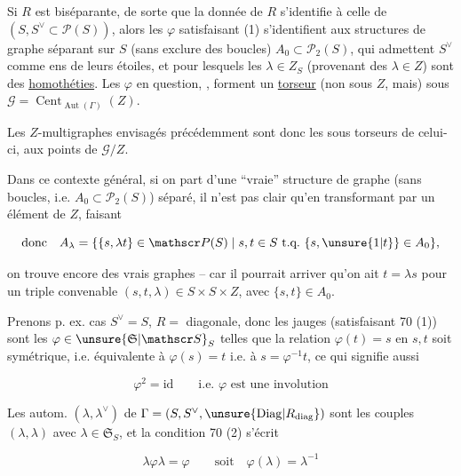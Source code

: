 Si $R$ est biséparante, de sorte que  la donnée de $R$ s'identifie à celle de $(S,S^\vee\subset\mathscr P(S))$, alors les $\varphi$ satisfaisant (1) s'identifient aux structures de graphe   séparant sur $S$ (sans exclure des boucles) $A_0\subset\mathscr P_2(S)$, qui admettent $S^\vee$ comme ens de leurs étoiles, et pour lesquels les $\lambda\in Z_S$ (provenant des $\lambda\in Z$) sont des \uline{homothéties}.  Les $\varphi$ en question, , forment un \uline{torseur} (non sous $Z$, mais) sous $\mathcal G=\operatorname{Cent}_{\operatorname{Aut}(\Gamma)}(Z)$.

Les $Z$-multigraphes envisagés précédemment sont donc les sous torseurs de celui-ci,   aux points de $\mathcal G/Z$.



Dans ce contexte général, si on part d'une ``vraie'' structure de graphe (sans boucles, i.e. $A_0\subset\mathscr P_2(S)$) séparé, il n'est pas clair qu'en  transformant par un élément de $Z$, faisant

\[
\text{donc}\quad A_\lambda=\{\{s,\lambda t\}\in\mathscr P(S)\mid s,t\in S\ \text{t.q.}\ \{s,\unsure{1|t}\}\in A_0\},
\]

on trouve encore des vrais graphes -- car il pourrait arriver qu'on ait $t=\lambda s$ pour un \deleted{$\lambda$} triple convenable $(s,t,\lambda)\in S\times S\times Z$, avec $\{s,t\}\in A_0$.

Prenons p. ex. cas $S^\vee=S$, $R={}$ diagonale, donc les jauges (satisfaisant 70 (1)) sont les $\varphi\in\unsure{\mathfrak S|\mathscr S}_S$ telles que la relation  $\varphi(t)=s$ en $s,t$ soit symétrique, i.e. équivalente à $\varphi(s)=t$ i.e. à $s=\varphi^{-1}t$, ce qui signifie aussi

\[
\varphi^2=\mathrm{id}\qquad\text{i.e. }\varphi\text{ est une involution} \tag*{(71)}
\]

Les autom.  $(\lambda,\lambda^\vee)$ de $\Gamma=(S,S^\vee,\unsure{\mathrm{Diag}|R_{\mathrm{diag}}})$ sont les couples $(\lambda,\lambda)$ avec $\lambda\in\mathfrak S_S$, et la condition 70 (2) s'écrit

\[
\lambda\varphi\lambda=\varphi\qquad\text{soit}\quad\varphi(\lambda)=\lambda^{-1} \tag*{(72)}
\]

